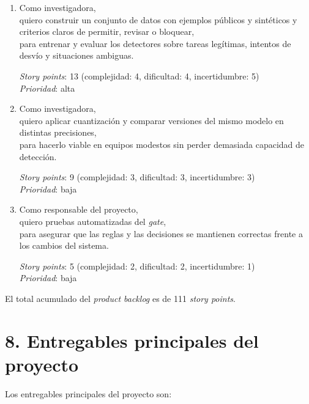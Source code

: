 \documentclass[
11pt, %
]{charter}
\begin{document}
\begin{enumerate}
	\textit{Story points}: 10 (complejidad: 4, dificultad: 3, incertidumbre: 3) \\
	\textit{Prioridad}: media

	\item Como investigadora, \\
	quiero construir un conjunto de datos con ejemplos públicos y sintéticos y criterios claros de permitir, revisar o bloquear, \\
	para entrenar y evaluar los detectores sobre tareas legítimas, intentos de desvío y situaciones ambiguas.

	\textit{Story points}: 13 (complejidad: 4, dificultad: 4, incertidumbre: 5) \\
	\textit{Prioridad}: alta

	\item Como investigadora, \\
	quiero aplicar cuantización y comparar versiones del mismo modelo en distintas precisiones, \\
	para hacerlo viable en equipos modestos sin perder demasiada capacidad de detección.

	\textit{Story points}: 9 (complejidad: 3, dificultad: 3, incertidumbre: 3) \\
	\textit{Prioridad}: baja

	\item Como responsable del proyecto, \\
	quiero pruebas automatizadas del \textit{gate}, \\
	para asegurar que las reglas y las decisiones se mantienen correctas frente a los cambios del sistema.

	\textit{Story points}: 5 (complejidad: 2, dificultad: 2, incertidumbre: 1) \\
	\textit{Prioridad}: baja
\end{enumerate}

El total acumulado del \textit{product backlog} es de 111 \textit{story points}.

\pagebreak

\section{8. Entregables principales del proyecto}
\label{sec:entregables}

Los entregables principales del proyecto son:
\end{document}
